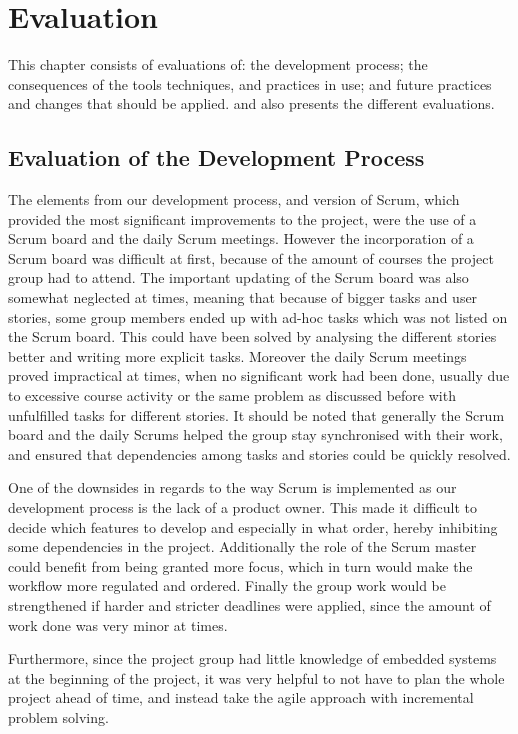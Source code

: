 \chapter{Evaluation} %
\label{cha:evaluation}
This chapter consists of evaluations of: the development process; the consequences of the tools techniques, and practices in use; and future practices and changes that should be applied.
 and  also presents the different evaluations.

\section{Evaluation of the Development Process} %
\label{sec:evaluation_of_the_development_process}

The elements from our development process, and version of Scrum, which provided the most significant improvements to the project, were the use of a Scrum board and the daily Scrum meetings.
However the incorporation of a Scrum board was difficult at first, because of the amount of courses the project group had to attend.
The important updating of the Scrum board was also somewhat neglected at times, meaning that because of bigger tasks and user stories, some group members ended up with ad-hoc tasks which was not listed on the Scrum board.
This could have been solved by analysing the different stories better and writing more explicit tasks.
Moreover the daily Scrum meetings proved impractical at times, when no significant work had been done, usually due to excessive course activity or the same problem as discussed before with unfulfilled tasks for different stories.
It should be noted that generally the Scrum board and the daily Scrums helped the group stay synchronised with their work, and ensured that dependencies among tasks and stories could be quickly resolved.

One of the downsides in regards to the way Scrum is implemented as our development process is the lack of a product owner.
This made it difficult to decide which features to develop and especially in what order, hereby inhibiting some dependencies in the project.
Additionally the role of the Scrum master could benefit from being granted more focus, which in turn would make the workflow more regulated and ordered.
Finally the group work would be strengthened if harder and stricter deadlines were applied, since the amount of work done was very minor at times.   

Furthermore, since the project group had little knowledge of embedded systems at the beginning of the project, it was very helpful to not have to plan the whole project ahead of time, and instead take the agile approach with incremental problem solving.

